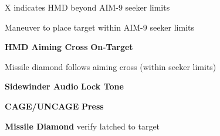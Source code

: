 \begin{checklistenumerate}
{{
        \caption{X indicates HMD beyond AIM-9 seeker limits}
    }
    \begin{subenumerate}
        \item Maneuver to place target within AIM-9 seeker limits
        \item \textbf{HMD Aiming Cross} \dotfill \textbf{On-Target}
    \end{subenumerate}

    Missile diamond follows aiming cross (within seeker limits)

    \begin{subenumerate}[start=3]
        \item \textbf{Sidewinder Audio} \dotfill \textbf{Lock Tone}
        \item \textbf{CAGE/UNCAGE} \dotfill \textbf{Press}
        \item \textbf{Missile Diamond} \dotfill verify latched to target
    \end{subenumerate}}
\end{checklistenumerate}


